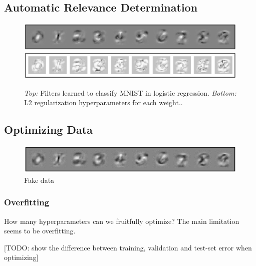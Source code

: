 \documentclass{article}
\begin{document}
\subsection{Automatic Relevance Determination}

\begin{figure}[h!]
\begin{center}
\includegraphics[width=\columnwidth]{../experiments/Jan_21_nn_ard/2/weights.pdf}
\includegraphics[width=\columnwidth]{../experiments/Jan_21_nn_ard/2/penalties.pdf}
\caption{\emph{Top:} Filters learned to classify MNIST in logistic regression.
\emph{Bottom:} L2 regularization hyperparameters for each weight..}
\label{fig:logistic ard}
\end{center}
\end{figure} 


\subsection{Optimizing Data}

\begin{figure}[h!]
\begin{center}
\includegraphics[width=\columnwidth]{../experiments/Jan_19_optimize_data/4/fake_data.pdf}
\caption{Fake data}
\label{fig:logistic ard}
\end{center}
\end{figure} 


\subsubsection{Overfitting}

How many hyperparameters can we fruitfully optimize?
The main limitation seems to be overfitting.

[TODO: show the difference between training, validation and test-set error when optimizing]
\end{document}
